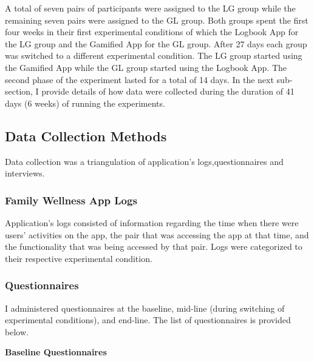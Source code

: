A total of seven pairs of participants were assigned to the LG group while the remaining seven pairs were assigned to the GL group. Both groups spent the first four weeks in their first experimental conditions of which the Logbook App for the LG group and the Gamified App for the GL group. After 27 days each group was switched to a different experimental condition. The LG group started using the Gamified App while the GL group started using the Logbook App. The second phase of the experiment lasted for a total of 14 days. In the next sub-section, I provide details of how data were collected during the duration of 41 days (6 weeks) of running the experiments. 

\subsection{Data Collection Methods}
Data collection was a triangulation of application's logs,questionnaires and interviews. 
\subsubsection{Family Wellness App Logs}
Application's logs consisted of information regarding the time when there were users' activities on the app, the pair that was accessing the app at that time, and the functionality that was being accessed by that pair. Logs were categorized to their respective experimental condition. 
\subsubsection{Questionnaires}\label{methodsquestionnaire}
I administered questionnaires at the baseline, mid-line (during switching of experimental conditions), and end-line. The list of questionnaires is provided below.

\textbf{Baseline Questionnaires}

